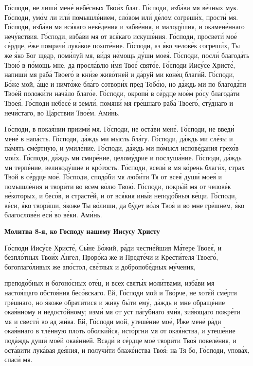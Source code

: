    Го́споди, не лиши́ мене́ небе́сных Твои́х благ. Го́споди, изба́ви мя ве́чных
мук. Го́споди, умо́м ли или́ помышле́нием, сло́вом или́ де́лом согреши́х,
прости́ мя. Го́споди, изба́ви мя вся́каго неве́дения и забве́ния, и малоду́шия, и
окамене́ннаго нечу́вствия. Го́споди, изба́ви мя от вся́каго искуше́ния.
Го́споди, просвети́ мое́ се́рдце, е́же помрачи́ лука́вое похоте́ние. Го́споди,
аз я́ко челове́к согреши́х, Ты же я́ко Бог щедр, поми́луй мя, ви́дя
не́мощь ду́ши моея́. Го́споди, посли́ благода́ть Твою́ в по́мощь мне,
да просла́влю и́мя Твое́ свято́е. Го́споди Иису́се Христе́, напиши́ мя
раба́ Твоего́ в кни́зе живо́тней и да́руй ми коне́ц благи́й. Го́споди,
Бо́же мой, а́ще и ничто́же бла́го сотвори́х пред Тобо́ю, но да́ждь
ми по благода́ти Твое́й положи́ти нача́ло благо́е. Го́споди, окропи́ в
се́рдце мое́м ро́су благода́ти Твоея́. Го́споди небесе́ и земли́, помяни́ мя
гре́шнаго раба́ Твоего́, сту́днаго и нечи́стаго, во Ца́рствии Твое́м.
Ами́нь.


   Го́споди, в покая́нии приими́ мя. Го́споди, не оста́ви мене́. Го́споди, не
введи́ мене́ в напа́сть. Го́споди, да́ждь ми мысль бла́гу. Го́споди, да́ждь ми
сле́зы и па́мять сме́ртную, и умиле́ние. Го́споди, да́ждь ми по́мысл
испове́дания грехо́в мои́х. Го́споди, да́ждь ми смире́ние, целому́дрие и
послуша́ние. Го́споди, да́ждь ми терпе́ние, великоду́шие и кро́тость. Го́споди,
всели́ в мя ко́рень благи́х, страх Твой в се́рдце мое́. Го́споди, сподо́би мя
люби́ти Тя от всея́ души́ моея́ и помышле́ния и твори́ти во всем во́лю Твою́.
Го́споди, покры́й мя от челове́к не́которых, и бесо́в, и страсте́й, и от вся́кия
ины́я неподо́бныя ве́щи. Го́споди, ве́си, я́ко твори́ши, я́коже Ты во́лиши,
да бу́дет во́ля Твоя́ и во мне гре́шнем, я́ко благослове́н еси́ во ве́ки.
Ами́нь.



 

\bfseries Молитва 8-я, ко Господу нашему Иисусу Христу\normalfont{}


   Го́споди Иису́се Христе́, Сы́не Бо́жий, ра́ди честне́йшия Ма́тере Твоея́,
и безпло́тных Твои́х А́нгел, Проро́ка же и Предте́чи и Крести́теля
Твоего́, богоглаго́ливых же апо́стол, све́тлых и добропобе́дных му́ченик,

преподо́бных и богоно́сных оте́ц, и всех святы́х моли́твами, изба́ви мя
настоя́щаго обстоя́ния бесо́вскаго. Ей, Го́споди мой и Тво́рче, не хотя́й
сме́рти гре́шнаго, но я́коже обрати́тися и жи́ву бы́ти ему́, да́ждь и мне
обраще́ние окая́нному и недосто́йному; изми́ мя от уст па́губнаго
зми́я, зия́ющаго пожре́ти мя и свести́ во ад жи́ва. Ей, Го́споди мой,
утеше́ние мое́, И́же мене́ ра́ди окая́ннаго в тле́нную плоть оболки́йся,
исто́ргни мя от окая́нства, и утеше́ние пода́ждь души́ мое́й окая́нней.
Всади́ в се́рдце мое́ твори́ти Твоя́ повеле́ния, и оста́вити лука́вая
дея́ния, и получи́ти блаже́нства Твоя́: на Тя бо, Го́споди, упова́х, спаси́
мя.



